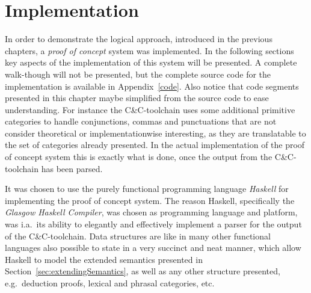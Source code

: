 

\chapter{Implementation}
\label{chap:implementation}

In order to demonstrate the logical approach, introduced in the previous chapters, a \emph{proof of concept} system was implemented. In the following sections key aspects of the implementation of this system will be presented. A complete walk-though will not be presented, but the complete source code for the implementation is available in Appendix~\ref{code}. Also notice that code segments presented in this chapter maybe simplified from the source code to ease understanding. For instance the C\&C-toolchain uses some additional primitive categories to handle conjunctions, commas and punctuations that are not consider theoretical or implementationwise interesting, as they are translatable to the set of categories already presented. In the actual implementation of the proof of concept system this is exactly what is done, once the output from the C\&C-toolchain has been parsed.

It was chosen to use the purely functional programming language \emph{Haskell} for implementing the proof of concept system. The reason Haskell, specifically the \emph{Glasgow Haskell Compiler}, was chosen as programming language and platform, was i.a.\ its ability to elegantly and effectively implement a parser for the output of the C\&C-toolchain. Data structures are like in many other functional languages also possible to state in a very succinct and neat manner, which allow Haskell to model the extended semantics presented in Section~\ref{sec:extendingSemantics}, as well as any other structure presented, e.g.\ deduction proofs, lexical and phrasal categories, etc.

